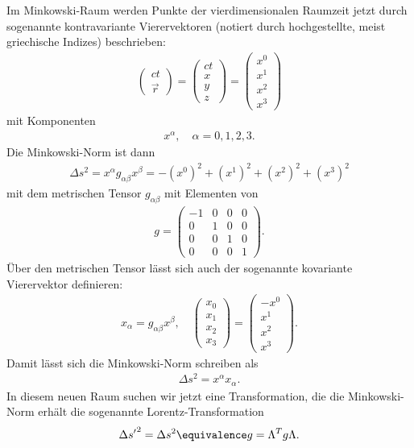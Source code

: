 Im Minkowski-Raum werden Punkte der vierdimensionalen Raumzeit jetzt durch sogenannte kontravariante Vierervektoren (notiert durch hochgestellte, meist griechische Indizes) beschrieben:
\begin{align*}
    \begin{pmatrix} ct \\ \vec r \end{pmatrix} = \begin{pmatrix} ct \\ x \\ y \\ z \end{pmatrix}   = \begin{pmatrix} x^0 \\ x^1 \\ x^2 \\ x^3 \end{pmatrix}
\end{align*}
mit Komponenten
\begin{align*}
    x^\alpha,\quad \alpha=0,1,2,3.
\end{align*}
Die Minkowski-Norm ist dann
\begin{align*}
    \Delta s^2=x^\alpha g_{\alpha\beta}x^\beta=-(x^0)^2+(x^1)^2+(x^2)^2+(x^3)^2
\end{align*}
mit dem metrischen Tensor $g_{\alpha\beta}$ mit Elementen von
\begin{align*}
    g = \begin{pmatrix}
            -1 & 0 & 0 & 0 \\
            0  & 1 & 0 & 0 \\
            0  & 0 & 1 & 0 \\
            0  & 0 & 0 & 1
        \end{pmatrix}.
\end{align*}
Über den metrischen Tensor lässt sich auch der sogenannte kovariante Vierervektor definieren:
\begin{align*}
    x_\alpha=g_{\alpha\beta}x^\beta, \quad \begin{pmatrix} x_0 \\ x_1 \\ x_2 \\ x_3 \end{pmatrix}=\begin{pmatrix} -x^0 \\ x^1 \\ x^2 \\ x^3 \end{pmatrix}.
\end{align*}
Damit lässt sich die Minkowski-Norm schreiben als
\begin{align*}
    \Delta s^2=x^\alpha x_\alpha.
\end{align*}
In diesem neuen Raum suchen wir jetzt eine Transformation, die die Minkowski-Norm erhält \textendash{} die sogenannte Lorentz-Transformation
\begin{align*}
    {\Delta s'}^2 = \Delta s^2 \equivalence g=\Lambda^T g\Lambda.
\end{align*}



